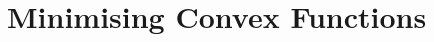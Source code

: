 \documentclass[british,11pt,a4paper]{report}
\begin{document}
\maketitle
\tableofcontents
\chapter{Minimising Convex Functions}

\end{document}
